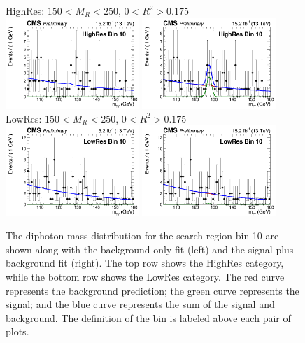 \begin{figure}[ht!]
\centering
HighRes: $150 < M_{R} < 250$\GeV, $0 < R^{2}>0.175$\\
\includegraphics[width=0.45\textwidth, angle=0.]{figs/unblindedResults2p3Plus12p9/highResBin10_fit_b.png}
\includegraphics[width=0.45\textwidth, angle=0.]{figs/unblindedResults2p3Plus12p9/highResBin10_fit_s.png}\\
LowRes: $150 < M_{R} < 250$\GeV, $0 < R^{2}>0.175$\\
\includegraphics[width=0.45\textwidth, angle=0.]{figs/unblindedResults2p3Plus12p9/lowResBin10_fit_b.png}
\includegraphics[width=0.45\textwidth, angle=0.]{figs/unblindedResults2p3Plus12p9/lowResBin10_fit_s.png}\\
\caption{ The diphoton mass distribution for the search region bin 10 
are shown along with the background-only fit (left) and the signal plus background fit (right).
The top row shows the HighRes category, while the bottom row shows the LowRes category.
The red curve represents the background prediction; the green curve represents the signal; 
and the blue curve represents the sum of the signal and background. The definition of the bin
is labeled above each pair of plots.
\label{fig:UnblindedResultsBin10}}
\end{figure}

